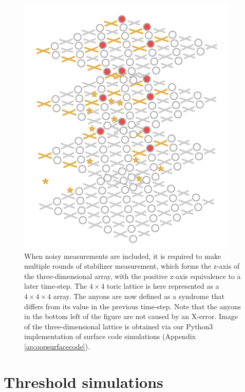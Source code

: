 \begin{figure}[htbp]
  \centering
  \includegraphics[width=.5\textwidth]{fig/3dlattice.pdf}
  \hspace{1cm}
  \caption{When noisy measurements are included, it is required to make multiple rounds of stabilizer measurement, which forms the z-axis of the three-dimensional array, with the positive z-axis equivalence to a later time-step. The $4\times 4$ toric lattice is here represented as a $4\times 4\times 4$ array. The anyons are now defined as a syndrome that differs from its value in the previous time-step. Note that the anyons in the bottom left of the figure are not caused by an X-error. Image of the three-dimensional lattice is obtained via our Python3 implementation of surface code simulations (Appendix \ref{ap:oopsurfacecode}).}
\end{figure}

\section{Threshold simulations}\label{sec:simthres}

